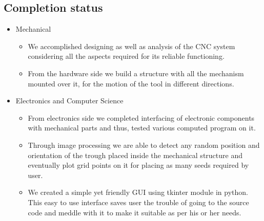 \documentclass[a4paper,12pt,oneside]{book}
\begin{document}
\subsection*{Completion status}
\begin{itemize}
\item Mechanical
	\begin{itemize}
	\item We accomplished designing as well as analysis of the CNC system considering all the aspects required for its reliable 			functioning.
	\item From the hardware side we build a structure with all the mechanism mounted over it, for the motion of the tool in 				different directions.
	\end{itemize}
\item Electronics and Computer Science
	\begin{itemize}
	\item From electronics side we completed interfacing of electronic components with mechanical parts and thus, tested various 			computed program on it.
	\item Through image processing we are able to detect any random position and orientation of the trough placed inside the mechanical structure and eventually plot grid points on it for placing as many seeds required by user.
	\item We created a simple yet friendly GUI using tkinter module in python. This easy to use interface saves user the trouble of going to the source code and meddle with it to make it suitable as per his or her needs.
	\end{itemize}
\end{itemize}
\end{document}
